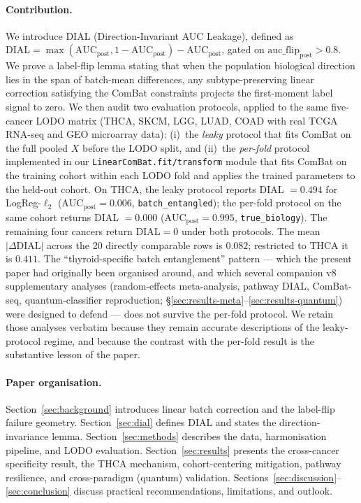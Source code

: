 \documentclass[11pt,a4paper]{article}
\begin{document}
\paragraph{Contribution.} We introduce DIAL
(Direction-Invariant AUC Leakage), defined as
$\mathrm{DIAL} = \max(\mathrm{AUC}_{\mathrm{post}}, 1 -
\mathrm{AUC}_{\mathrm{post}}) - \mathrm{AUC}_{\mathrm{post}}$, gated on
$\mathrm{auc\_flip}_{\mathrm{post}} > 0.8$. We prove a label-flip lemma
stating that when the population biological direction lies in the span
of batch-mean differences, any subtype-preserving linear correction
satisfying the ComBat constraints projects the first-moment label signal
to zero. We then audit two evaluation protocols, applied to the same
five-cancer LODO matrix (THCA, SKCM, LGG, LUAD, COAD with real TCGA
RNA-seq and GEO microarray data):
(i)~the \emph{leaky} protocol that fits ComBat on the full pooled $X$
before the LODO split, and (ii)~the \emph{per-fold} protocol
implemented in our \texttt{LinearComBat.fit/transform} module that fits
ComBat on the training cohort within each LODO fold and applies the
trained parameters to the held-out cohort.
On THCA, the leaky protocol reports DIAL $= 0.494$ for LogReg-$\ell_2$
($\mathrm{AUC}_{\mathrm{post}} = 0.006$, \texttt{batch\_entangled});
the per-fold protocol on the same cohort returns DIAL $= 0.000$
($\mathrm{AUC}_{\mathrm{post}} = 0.995$, \texttt{true\_biology}).
The remaining four cancers return $\mathrm{DIAL} = 0$ under both
protocols. The mean $|\Delta\mathrm{DIAL}|$ across the 20 directly
comparable rows is $0.082$; restricted to THCA it is $0.411$. The
``thyroid-specific batch entanglement'' pattern --- which the present
paper had originally been organised around, and which several
companion v8 supplementary analyses (random-effects meta-analysis,
pathway DIAL, ComBat-seq, quantum-classifier reproduction; \S\ref{sec:results-meta}--\ref{sec:results-quantum})
were designed to defend --- does not survive the per-fold protocol.
We retain those analyses verbatim because they remain accurate
descriptions of the leaky-protocol regime, and because the contrast
with the per-fold result is the substantive lesson of the paper.

\paragraph{Paper organisation.} Section~\ref{sec:background}
introduces linear batch correction and the label-flip failure
geometry. Section~\ref{sec:dial} defines DIAL and states the
direction-invariance lemma. Section~\ref{sec:methods} describes the
data, harmonisation pipeline, and LODO evaluation.
Section~\ref{sec:results} presents the cross-cancer specificity
result, the THCA mechanism, cohort-centering mitigation, pathway
resilience, and cross-paradigm (quantum) validation.
Sections~\ref{sec:discussion}--\ref{sec:conclusion} discuss
practical recommendations, limitations, and outlook.
\end{document}
